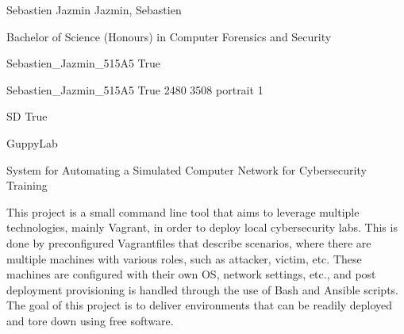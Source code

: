 \documentclass[twoside]{report}
\begin{document}
\begingroup{}\relax



\def\Key{Sebastien_Jazmin_515A5}

{Sebastien Jazmin}
{Jazmin, Sebastien}

{Bachelor of Science (Honours) in Computer Forensics and Security}

{Sebastien_Jazmin_515A5}
{True}

{Sebastien_Jazmin_515A5}
{True}
{2480}
{3508}
{portrait}
{1}

{SD}
{True}

{GuppyLab}

{System for Automating a Simulated Computer Network for Cybersecurity Training}

{This project is a small command line tool that aims to leverage multiple technologies, mainly Vagrant, in order to deploy local cybersecurity labs. This is done by preconfigured Vagrantfiles that describe scenarios, where there are multiple machines with various roles, such as attacker, victim, etc. These machines are configured with their own OS, network settings, etc., and post deployment provisioning is handled through the use of Bash and Ansible scripts.  The goal of this project is to deliver environments that can be readily deployed and tore down using free software.}
\end{document}
